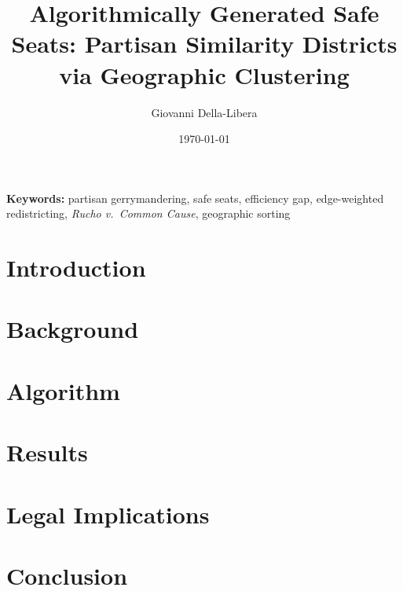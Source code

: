 \documentclass[12pt]{article}
\title{Algorithmically Generated Safe Seats: Partisan Similarity Districts\\
via Geographic Clustering}
\author{Giovanni Della-Libera}
\date{\today}
\begin{document}
\maketitle

\begin{abstract}

\end{abstract}

\noindent\textbf{Keywords:} partisan gerrymandering, safe seats, efficiency gap,
edge-weighted redistricting, \emph{Rucho v.\ Common Cause}, geographic sorting

\section{Introduction}


\section{Background}


\section{Algorithm}


\section{Results}


\section{Legal Implications}


\section{Conclusion}




\end{document}
